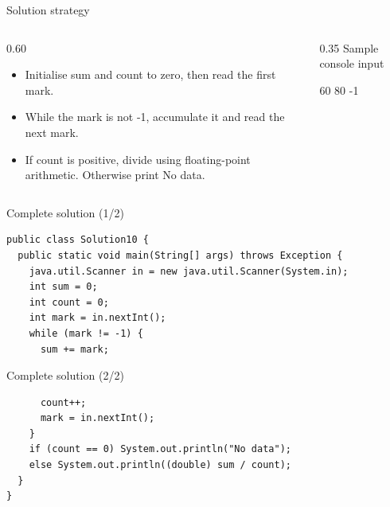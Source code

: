 \documentclass[10pt,aspectratio=169]{beamer}
\begin{document}
\begin{frame}[fragile,t]{Solution strategy}
\begin{columns}[T,onlytextwidth]\begin{column}{0.60\textwidth}
\begin{itemize}
\item Initialise sum and count to zero, then read the first mark.
\item While the mark is not -1, accumulate it and read the next mark.
\item If count is positive, divide using floating-point arithmetic. Otherwise print No data.
\end{itemize}
\end{column}\begin{column}{0.35\textwidth}\small
Sample console input\par 60 80 -1\par 
\end{column}\end{columns}
\end{frame}

\begin{frame}[fragile,t]{Complete solution (1/2)}
\begin{lstlisting}
public class Solution10 {
  public static void main(String[] args) throws Exception {
    java.util.Scanner in = new java.util.Scanner(System.in);
    int sum = 0;
    int count = 0;
    int mark = in.nextInt();
    while (mark != -1) {
      sum += mark;
\end{lstlisting}
\end{frame}

\begin{frame}[fragile,t]{Complete solution (2/2)}
\begin{lstlisting}
      count++;
      mark = in.nextInt();
    }
    if (count == 0) System.out.println("No data");
    else System.out.println((double) sum / count);
  }
}
\end{lstlisting}
\end{frame}
\end{document}
